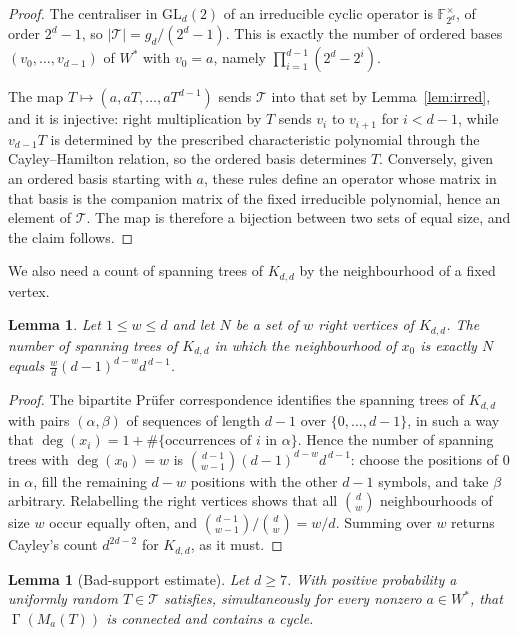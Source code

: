 \documentclass[11pt,reqno]{amsart}
\theoremstyle{plain}
\newtheorem{lemma}[theorem]{Lemma}
\theoremstyle{definition}
\newcommand{\FF}{\mathbb{F}}
\newcommand{\GL}{\mathrm{GL}}
\DeclareMathOperator{\Gam}{\Gamma}
\begin{document}
\begin{proof}
The centraliser in $\GL_{d}(2)$ of an irreducible cyclic operator is $\FF_{2^{d}}^{\times}$, of order $2^{d}-1$, so $|\mathcal{T}|=g_{d}/(2^{d}-1)$. This is exactly the number of ordered bases $(v_{0},\dots,v_{d-1})$ of $W^{*}$ with $v_{0}=a$, namely $\prod_{i=1}^{d-1}(2^{d}-2^{i})$.

The map $T\mapsto(a,aT,\dots,aT^{d-1})$ sends $\mathcal{T}$ into that set by Lemma~\ref{lem:irred}, and it is injective: right multiplication by $T$ sends $v_{i}$ to $v_{i+1}$ for $i<d-1$, while $v_{d-1}T$ is determined by the prescribed characteristic polynomial through the Cayley--Hamilton relation, so the ordered basis determines $T$. Conversely, given an ordered basis starting with $a$, these rules define an operator whose matrix in that basis is the companion matrix of the fixed irreducible polynomial, hence an element of $\mathcal{T}$. The map is therefore a bijection between two sets of equal size, and the claim follows.
\end{proof}

We also need a count of spanning trees of $K_{d,d}$ by the neighbourhood of a fixed vertex.

\begin{lemma}\label{lem:trees}
Let $1\le w\le d$ and let $N$ be a set of $w$ right vertices of $K_{d,d}$. The number of spanning trees of $K_{d,d}$ in which the neighbourhood of $x_{0}$ is exactly $N$ equals $\tfrac{w}{d}(d-1)^{d-w}d^{\,d-1}$.
\end{lemma}

\begin{proof}
The bipartite Prüfer correspondence identifies the spanning trees of $K_{d,d}$ with pairs $(\alpha,\beta)$ of sequences of length $d-1$ over $\{0,\dots,d-1\}$, in such a way that $\deg(x_{i})=1+\#\{\text{occurrences of }i\text{ in }\alpha\}$. Hence the number of spanning trees with $\deg(x_{0})=w$ is $\binom{d-1}{w-1}(d-1)^{d-w}d^{\,d-1}$: choose the positions of $0$ in $\alpha$, fill the remaining $d-w$ positions with the other $d-1$ symbols, and take $\beta$ arbitrary. Relabelling the right vertices shows that all $\binom{d}{w}$ neighbourhoods of size $w$ occur equally often, and $\binom{d-1}{w-1}/\binom{d}{w}=w/d$. Summing over $w$ returns Cayley's count $d^{2d-2}$ for $K_{d,d}$, as it must.
\end{proof}

\begin{lemma}[Bad-support estimate]\label{lem:bad}
Let $d\ge 7$. With positive probability a uniformly random $T\in\mathcal{T}$ satisfies, simultaneously for every nonzero $a\in W^{*}$, that $\Gam(M_{a}(T))$ is connected and contains a cycle.
\end{lemma}
\end{document}
